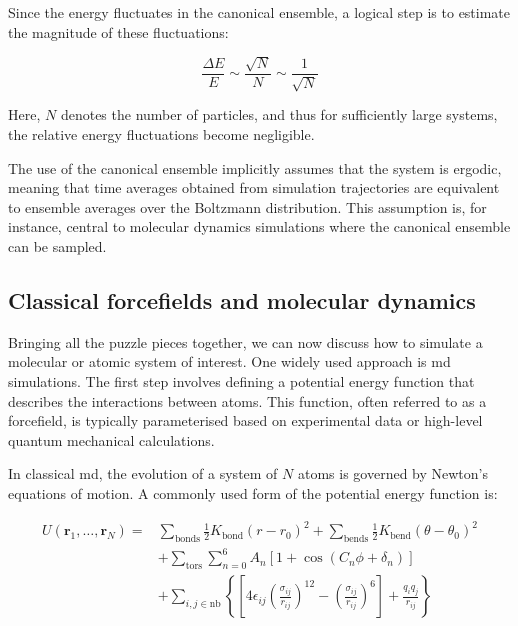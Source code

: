 Since the energy fluctuates in the canonical ensemble, a logical step is to estimate the magnitude of these fluctuations:

\begin{equation}
    \frac{\Delta E}{E} \sim \frac{\sqrt{N}}{N} \sim \frac{1}{\sqrt{N}}
\end{equation}

Here, $N$ denotes the number of particles, and thus for sufficiently large systems, the relative energy fluctuations become negligible.

The use of the canonical ensemble implicitly assumes that the system is ergodic, meaning that time averages obtained from simulation trajectories are equivalent to ensemble averages over the Boltzmann distribution. This assumption is, for instance, central to molecular dynamics simulations where the canonical ensemble can be sampled.



\subsection{Classical forcefields and molecular dynamics}
Bringing all the puzzle pieces together, we can now discuss how to simulate a molecular or atomic system of interest. One widely used approach is \ac{md} simulations. The first step involves defining a potential energy function that describes the interactions between atoms. This function, often referred to as a forcefield, is typically parameterised based on experimental data or high-level quantum mechanical calculations.

In classical \ac{md}, the evolution of a system of $N$ atoms is governed by Newton's equations of motion. A commonly used form of the potential energy function is:

\begin{equation}
\begin{aligned}
    U(\mathbf{r}_1, \dots, \mathbf{r}_N) = &\sum_{\text{bonds}} \frac{1}{2} K_{\text{bond}} (r - r_0)^2 + 
    \sum_{\text{bends}} \frac{1}{2} K_{\text{bend}} (\theta - \theta_0)^2 \\
    &+ \sum_{\text{tors}} \sum_{n=0}^{6} A_n \left[ 1 + \cos(C_n \phi + \delta_n) \right] \\
    &+ \sum_{i,j \in \text{nb}} \left\{ \left[ 4\epsilon_{ij} \left( \frac{\sigma_{ij}}{r_{ij}} \right)^{12}
    - \left( \frac{\sigma_{ij}}{r_{ij}} \right)^6 \right] + \frac{q_i q_j}{r_{ij}} \right\}
\end{aligned}
\label{eq:md_potential}
\end{equation}

